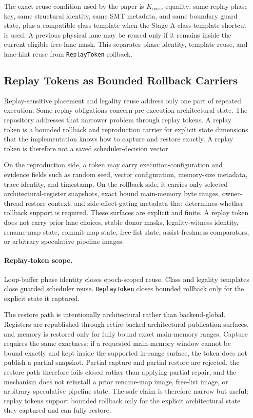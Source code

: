 \documentclass[twocolumn]{article}
\begin{document}
The exact reuse condition used by the paper is \(K_{\mathrm{reuse}}\) equality: same replay phase key, same structural identity, same SMT metadata, and same boundary guard state, plus a compatible class template when the Stage A class-template shortcut is used. A previous physical lane may be reused only if it remains inside the current eligible free-lane mask. This separates phase identity, template reuse, and lane-hint reuse from \texttt{ReplayToken} rollback.


\subsection{Replay Tokens as Bounded Rollback Carriers}

Replay-sensitive placement and legality reuse address only one part of repeated execution. Some replay obligations concern pre-execution architectural state. The repository addresses that narrower problem through replay tokens. A replay token is a bounded rollback and reproduction carrier for explicit state dimensions that the implementation knows how to capture and restore exactly. A replay token is therefore not a saved scheduler-decision vector.

On the reproduction side, a token may carry execution-configuration and evidence fields such as random seed, vector configuration, memory-size metadata, trace identity, and timestamp. On the rollback side, it carries only selected architectural-register snapshots, exact bound main-memory byte ranges, owner-thread restore context, and side-effect-gating metadata that determines whether rollback support is required. These surfaces are explicit and finite. A replay token does not carry prior lane choices, stable donor masks, legality-witness identity, rename-map state, commit-map state, free-list state, assist-freshness comparators, or arbitrary speculative pipeline images.

\paragraph{Replay-token scope.}
Loop-buffer phase identity closes epoch-scoped reuse. Class and legality templates close guarded scheduler reuse. \texttt{ReplayToken} closes bounded rollback only for the explicit state it captured.

The restore path is intentionally architectural rather than backend-global. Registers are republished through retire-backed architectural publication surfaces, and memory is restored only for fully bound exact main-memory ranges. Capture requires the same exactness: if a requested main-memory window cannot be bound exactly and kept inside the supported in-range surface, the token does not publish a partial snapshot. Partial capture and partial restore are rejected, the restore path therefore fails closed rather than applying partial repair, and the mechanism does not reinstall a prior rename-map image, free-list image, or arbitrary speculative pipeline state. The safe claim is therefore narrow but useful: replay tokens support bounded rollback only for the explicit architectural state they captured and can fully restore.
\end{document}
